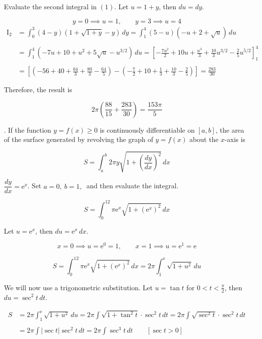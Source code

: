 \documentclass{article}
\begin{document}
\hfill

\noindent Evaluate the second integral in $(1)$. Let $u=1+y$, then $du=dy$.

\[y=0\implies u=1,\qquad y=3\implies u=4\]
\begin{align*}\mathrm{I}_2&=\int_0^3(4-y)\left(1+\sqrt{1+y}-y\right)\,dy=\int_1^4(5-u)\left(-u+2+\sqrt u\right)\,du\\\\&=\int_1^4\left(-7u+10+u^2+5\sqrt u-u^{3/2}\right)\,du=\left[-\frac{7u^2}2+10u+\frac{u^3}3+\frac{10}3u^{3/2}-\frac25u^{5/2}\right]_1^4\\\\&=\left[\left(-56+40+\frac{64}3+\frac{80}3-\frac{64}5\right)-\left(-\frac72+10+\frac13+\frac{10}3-\frac25\right)\right]=\frac{283}{30}\end{align*}

\hfill

\noindent Therefore, the result is

\[2\pi\left(\frac{88}{15}+\frac{283}{30}\right)=\boxed{\frac{153\pi}5}\]

\hfill

. If the function $y=f(x)\geq0$ is continuously differentiable on $[a,b]$, the area of the surface generated by revolving the graph of $y=f(x)$ about the $x$-axis is

\[S=\int_a^b2\pi y\sqrt{1+\left(\frac{dy}{dx}\right)^2}\,dx\]

\hfill

\noindent $\dfrac{dy}{dx}=\mathrm{e}^x$. Set $a=0,\:b=1,\:$ and then evaluate the integral.

\[S=\int_0^12\pi\mathrm{e}^x\sqrt{1+\left(\mathrm{e}^x\right)^2}\,dx\]

\hfill

\noindent Let $u=\mathrm{e}^x$, then $du=\mathrm{e}^x\,dx$.

\[x=0\implies u=\mathrm{e}^0=1,\qquad x=1\implies u=\mathrm{e}^1=\mathrm{e}\]

\[S=\int_0^12\pi\mathrm{e}^x\sqrt{1+\left(\mathrm{e}^x\right)^2}\,dx=2\pi\int_1^{\mathrm{e}}\sqrt{1+u^2}\,du\]

\hfill

\noindent We will now use a trigonometric substitution. Let $u=\tan t$ for $\displaystyle0<t<\frac\pi2$, then $du=\sec^2 t\,dt$.

\begin{align*}S&=2\pi\int_1^{\mathrm{e}}\sqrt{1+u^2}\,du=2\pi\int\sqrt{1+\tan^2t}\cdot\sec^2t\,dt=2\pi\int\sqrt{\sec^2t}\cdot\sec^2t\,dt\\\\&=2\pi\int\left|\sec t\right|\sec^2t\,dt=2\pi\int\sec^3t\,dt\qquad\left[\sec t>0\right]\end{align*}
\end{document}
